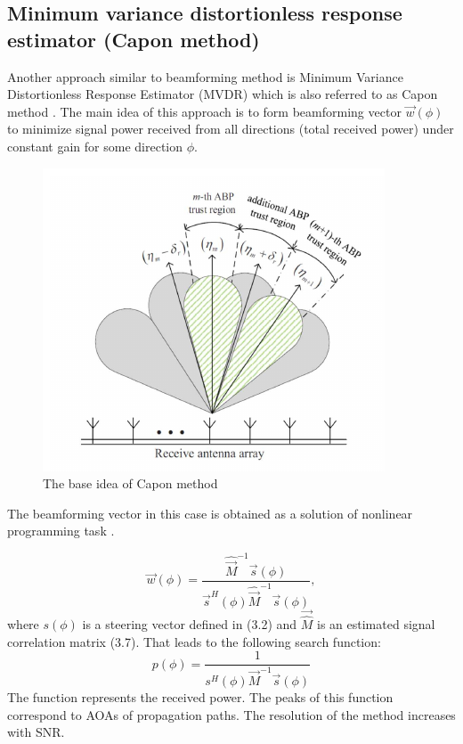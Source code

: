 \subsection{Minimum variance distortionless response estimator (Capon method)}%
\label{sub:minimum_variance_distortionless_response_estimator_capon_method_}

Another approach similar to beamforming method is Minimum Variance
Distortionless Response Estimator (MVDR) which is also referred to as Capon
method \cite{Stoica2005,Allen2006, Godara2004}. The main idea of this approach is to form beamforming
vector $\vec w(\phi)$  to minimize signal power received from all directions (total
received power) under constant gain for some direction $\phi$.

\begin{figure}[h]
    \centering
    \includegraphics[width=0.6\linewidth]{figs/fig3.14.png}
    \caption{The base idea of Capon method}
    \label{fig:3.15}
\end{figure}
The beamforming vector in this case is obtained as a solution of nonlinear
programming task \cite{Stoica2005, Godara2004}.

\begin{equation}
    \label{eq:}
    \vec w(\phi) = \frac{\hat \vec M^{-1} \vec s (\phi)}{\vec s^H(\phi)\hat
    \vec M^{-1} \vec s(\phi)},
\end{equation}
where $s(\phi)$ is a steering vector defined in (3.2) and $\vec \hat M$ is an estimated signal correlation matrix (3.7).
That leads to the following search function:
\begin{equation}
    \label{eq:}
    p(\phi) = \frac{1}{s^H(\phi) \vec M^{-1} \vec s(\phi)}
\end{equation}
The function represents the received power. The peaks of this function
correspond to AOAs of propagation paths. The resolution of the method increases
with SNR.

